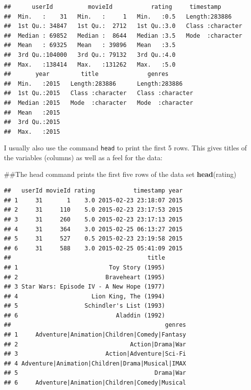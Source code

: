 \documentclass[]{book}
\newenvironment{Shaded}{\begin{snugshade}}{\end{snugshade}}
\newcommand{\KeywordTok}[1]{\textcolor[rgb]{0.13,0.29,0.53}{\textbf{{#1}}}}
\newcommand{\NormalTok}[1]{{#1}}
\begin{document}
\begin{verbatim}
##      userId          movieId           rating     timestamp        
##  Min.   :    31   Min.   :     1   Min.   :0.5   Length:283886     
##  1st Qu.: 34847   1st Qu.:  2712   1st Qu.:3.0   Class :character  
##  Median : 69852   Median :  8644   Median :3.5   Mode  :character  
##  Mean   : 69325   Mean   : 39896   Mean   :3.5                     
##  3rd Qu.:104000   3rd Qu.: 79132   3rd Qu.:4.0                     
##  Max.   :138414   Max.   :131262   Max.   :5.0                     
##       year         title              genres         
##  Min.   :2015   Length:283886      Length:283886     
##  1st Qu.:2015   Class :character   Class :character  
##  Median :2015   Mode  :character   Mode  :character  
##  Mean   :2015                                        
##  3rd Qu.:2015                                        
##  Max.   :2015
\end{verbatim}

I usually also use the command \texttt{head} to print the first 5 rows.
This gives titles of the variables (columns) as well as a feel for the
data:

\begin{Shaded}
\begin{Highlighting}[]
\NormalTok{##The head command prints the first five rows of the data set}
\KeywordTok{head}\NormalTok{(rating)}
\end{Highlighting}
\end{Shaded}

\begin{verbatim}
##   userId movieId rating           timestamp year
## 1     31       1    3.0 2015-02-23 23:18:07 2015
## 2     31     110    5.0 2015-02-23 23:17:53 2015
## 3     31     260    5.0 2015-02-23 23:17:13 2015
## 4     31     364    3.0 2015-02-25 06:13:27 2015
## 5     31     527    0.5 2015-02-23 23:19:58 2015
## 6     31     588    3.0 2015-02-25 05:41:09 2015
##                                       title
## 1                          Toy Story (1995)
## 2                         Braveheart (1995)
## 3 Star Wars: Episode IV - A New Hope (1977)
## 4                     Lion King, The (1994)
## 5                   Schindler's List (1993)
## 6                            Aladdin (1992)
##                                            genres
## 1     Adventure|Animation|Children|Comedy|Fantasy
## 2                                Action|Drama|War
## 3                         Action|Adventure|Sci-Fi
## 4 Adventure|Animation|Children|Drama|Musical|IMAX
## 5                                       Drama|War
## 6     Adventure|Animation|Children|Comedy|Musical
\end{verbatim}
\end{document}
